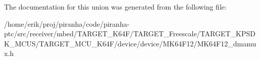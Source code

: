 The documentation for this union was generated from the following file\+:\begin{DoxyCompactItemize}
\item 
/home/erik/proj/piranha/code/piranha-\/ptc/src/receiver/mbed/\+T\+A\+R\+G\+E\+T\+\_\+\+K64\+F/\+T\+A\+R\+G\+E\+T\+\_\+\+Freescale/\+T\+A\+R\+G\+E\+T\+\_\+\+K\+P\+S\+D\+K\+\_\+\+M\+C\+U\+S/\+T\+A\+R\+G\+E\+T\+\_\+\+M\+C\+U\+\_\+\+K64\+F/device/device/\+M\+K64\+F12/M\+K64\+F12\+\_\+dmamux.\+h\end{DoxyCompactItemize}
